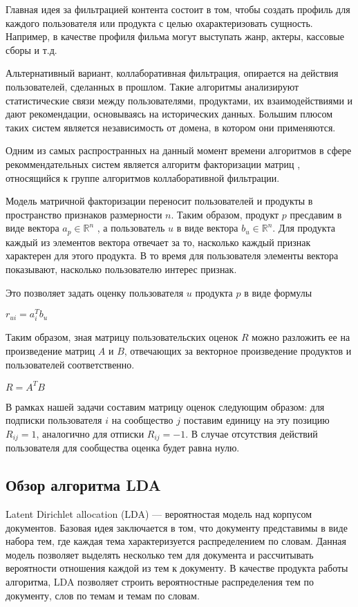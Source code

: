 \documentclass[times,specification,annotation]{itmo-student-thesis}
\begin{document}
Главная идея за фильтрацией контента состоит в том, чтобы создать профиль для каждого пользователя или продукта с целью охарактеризовать сущность. Например, в качестве профиля фильма могут выступать жанр, актеры, кассовые сборы и т.д.

Альтернативный вариант, коллаборативная фильтрация, опирается на действия пользователей, сделанных в прошлом. Такие алгоритмы анализируют статистические связи между пользователями, продуктами, их взаимодействиями и дают рекомендации, основываясь на исторических данных.  Большим плюсом таких систем является независимость от домена, в котором они применяются.

Одним из самых распространных на данный момент времени алгоритмов в сфере рекоммендательных систем является алгоритм факторизации матриц \cite{koren2009}, относящийся к группе алгоритмов коллаборативной фильтрации.

Модель матричной факторизации переносит пользователей и продукты в пространство признаков размерности $n$. Таким образом, продукт $p$ пресдавим в виде вектора $a_{p} \in \mathbb{R}^n$ , а пользователь $u$ в виде вектора $b_{u} \in \mathbb{R}^n$. Для продукта каждый из элементов вектора отвечает за то, насколько каждый признак характерен для  этого продукта. В то время для пользователя элементы вектора показывают, насколько пользователю интерес признак.

Это позволяет задать оценку пользователя $u$ продукта $p$ в виде формулы

$r_{ui} = a_{i}^{T}b_{u}$

Таким образом, зная матрицу пользовательских оценок $R$ можно разложить ее на произведение матриц $A$ и $B$, отвечающих за векторное произведение продуктов и пользователей соответственно.

$R = A^TB$

В рамках нашей задачи составим матрицу оценок следующим образом: для подписки пользователя $i$ на сообщество $j$ поставим единицу на эту позицию $R_{ij} = 1$, аналогично для отписки $R_{ij} = - 1$. В случае отсутствия действий пользователя для сообщества оценка будет равна нулю.


\subsection{Обзор алгоритма LDA}\label{sec:lda}

Latent Dirichlet allocation (LDA) \cite{lda2003} --- вероятностая модель над корпусом документов. Базовая идея заключается в том, что документу представимы в виде набора тем, где каждая тема характеризуется распределением по словам. Данная модель позволяет выделять несколько тем для документа и рассчитывать вероятности отношения каждой из тем к документу.
В качестве продукта работы алгоритма, LDA позволяет строить вероятностные распределения тем по документу, слов по темам и темам по словам.
\end{document}
